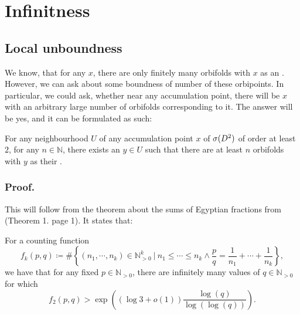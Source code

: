 


\section{Infinitness}
\subsection{Local unboundness}
We know, that for any $x$, there are only finitely many orbifolds with $x$ as an \Eoc . 
However, we can ask about some boundness of number of these orbipoints. 
In particular, we could ask, whether near any accumulation point, there will be $x$ with an 
arbitrary large number of orbifolds corresponding to it. 
The answer will be yes, and it can be formulated as such:
\begin{theorem}\label{unboundness}
For any neighbourhood $U$ of any accumulation point $x$ of ${{\sigma}(D^2)}$ of order at least $2$, for any 
$n\in \mathbb{N}$, 
there exists an $y\in U$ such that there are at least $n$ orbifolds with $y$ as their 
\Eoc.
\end{theorem}
\subsubsection{Proof.}
This will follow from the theorem about the sums of Egyptian fractions from \cite{Browning2011} 
(Theorem 1. page 1).
It states that: 
\begin{theorem}
For a counting function
\begin{equation}
f_k(p,q) \coloneqq 
\#\left\{(n_1, \cdots, n_k)\in \mathbb{N}_{>0}^k\ \Big|\ n_1 \leq \cdots \leq n_k 
\land \frac{p}{q} = \frac{1}{n_1} + \cdots + \frac{1}{n_k}\right\},
\end{equation}
we have that for any fixed $p\in\mathbb{N}_{>0}$, there are infinitely many values of 
$q\in\mathbb{N}_{>0}$ for which
\begin{equation}
f_2(p,q) > \exp\left((\log{3}+o(1))\frac{\log(q)}{\log(\log(q))}\right).
\end{equation}
\end{theorem}

